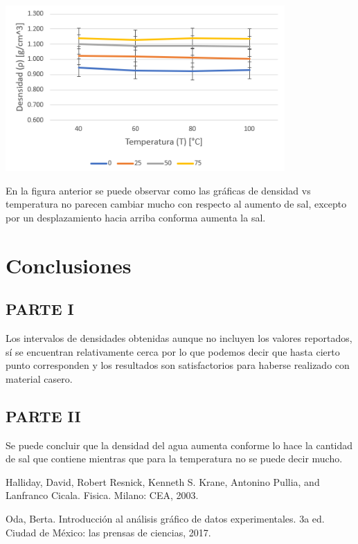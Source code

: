 \documentclass[DIV=calc, paper=a4, fontsize=11pt]{scrartcl}
\newenvironment{Figura}
  {\par\medskip\noindent\minipage{\linewidth}}
  {\endminipage\par\medskip}
\begin{document}
\begin{multicols}{2}
\begin{Figura}
\centering
    \includegraphics[width=0.8\textwidth]{graficasalinidad 2.PNG}
    \label{fig}
\end{Figura}

En la figura anterior se puede observar como las gráficas de densidad vs temperatura no parecen cambiar mucho con respecto al aumento de sal, excepto por un desplazamiento hacia arriba conforma aumenta la sal.

\section*{Conclusiones}

\subsection*{PARTE I}
Los intervalos de densidades obtenidas aunque no incluyen los valores reportados, sí se encuentran relativamente cerca por lo que podemos decir que hasta cierto punto corresponden y los resultados son satisfactorios para haberse realizado con material casero.

\subsection*{PARTE II}
Se puede concluir que la densidad del agua aumenta conforme lo hace la cantidad de sal que contiene mientras que para la temperatura no se puede decir mucho.


  
\begin{thebibliography}{99}
Halliday, David, Robert Resnick, Kenneth S. Krane, Antonino Pullia, and Lanfranco Cicala. Fisica. Milano: CEA, 2003. 


 Oda, Berta. Introducción al análisis gráfico de datos experimentales. 3a ed. Ciudad de México: las prensas de ciencias, 2017.




\end{thebibliography}
\end{multicols}
\end{document}

